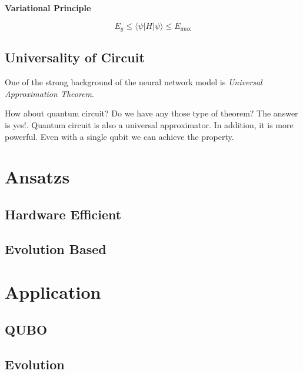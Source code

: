 \begin{principle}
    \textbf{Variational Principle}

    \begin{equation}
        E_{g} \leq \langle \psi | H | \psi \rangle \leq E_{\mbox{max}}
    \end{equation}
\end{principle}

\subsection{Universality of Circuit}

One of the strong background of the neural network model is 
\textit{Universal Approximation Theorem}. 

How about quantum circuit? Do we have any those type of theorem?
The answer is yes!. Quantum circuit is also a universal approximator.
In addition, it is more powerful. Even with a single qubit we can achieve the property\cite{PhysRevA.104.012405-Universal-approxi}.

\section{}

\section{Ansatzs}

\subsection{Hardware Efficient}

\subsection{Evolution Based}


\section{Application}

\subsection{QUBO}

\subsection{Evolution}

